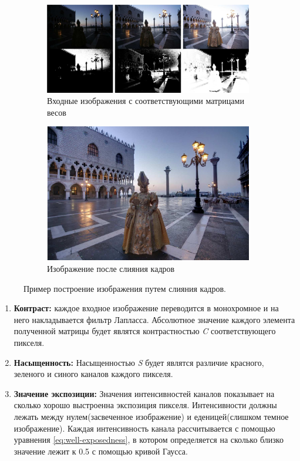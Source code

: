 \begin{figure}[!tbp]
  \centering
  \begin{subfigure}{.5\textwidth}
    \includegraphics[width=\textwidth]{img/weights.png}
    \caption{ Входные изображения с соответствующими матрицами весов}
    \label{fig:weights}
  \end{subfigure}\hfill
  \begin{subfigure}{.5\textwidth}
    \includegraphics[width=\textwidth]{img/weightsResult.png}
    \caption{ Изображение после слияния кадров}
  \end{subfigure}
  \caption { Пример построение изображения путем слияния кадров.}
  \label{fig:weightsResult}
\end{figure}

\begin{enumerate}
   \item \textbf{Контраст:} каждое входное изображение переводится в монохромное и на него накладывается фильтр Лапласса. Абсолютное значение каждого элемента полученной матрицы будет являтся контрастностью \textit{C} соответствующего пикселя.
    \item \textbf{Насыщенность:} Насыщенностью \textit{S} будет являтся различие красного, зеленого и синого каналов каждого пикселя.
    \item \textbf{Значение экспозиции:} Значения интенсивностей каналов показывает на сколько хорошо выстроенна экспозиция пикселя. Интенсивности должны лежать между нулем(засвеченное изображение) и еденицей(слишком темное изображение). Каждая интенсивность канала рассчитывается с помощью уравнения \ref{eq:well-exposedness}, в котором определяется на сколько близко значение лежит к 0.5 с помощью кривой Гаусса.
\end{enumerate}

